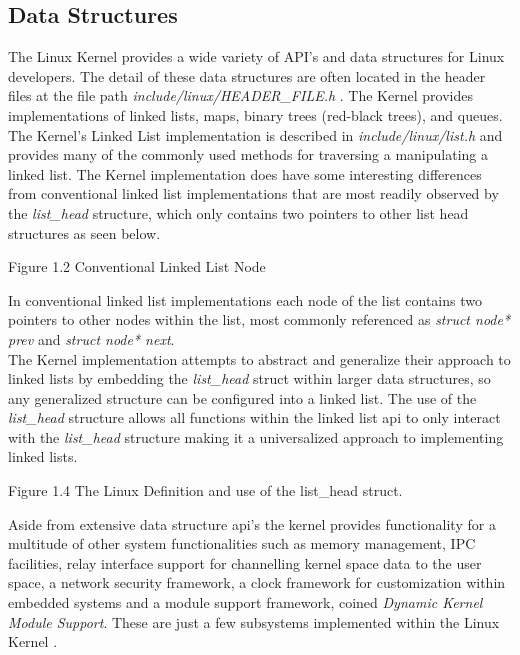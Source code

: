    \subsection{\bf Data Structures}
      \normalfont \indent The Linux Kernel provides a wide variety of API’s and data structures for Linux developers. The detail of these data structures are often located in the header files at the file path \textit{include/linux/HEADER\_FILE.h} \cite{linuxProgInterface2010}. The Kernel provides implementations of linked lists, maps, binary trees (red-black trees), and queues. The Kernel’s Linked List implementation is described in \textit{include/linux/list.h} and provides many of the commonly used methods for traversing a manipulating a linked list. The Kernel implementation does have some interesting differences from conventional linked list implementations that are most readily observed by the \textit{list\_head} structure, which only contains two pointers to other list head structures as seen below.\\ 

        
\begin{center}
Figure 1.2 Conventional Linked List Node 
\end{center}

	\normalfont \indent In conventional linked list implementations each node of the list contains two pointers to other nodes within the list, most commonly referenced as \textit{struct node* prev} and \textit{struct node* next}.\\
	
	\normalfont \indent The Kernel implementation attempts to abstract and generalize their approach to linked lists by embedding the \textit{list\_head} struct within larger data structures, so any generalized structure can be configured into a linked list. The use of the \textit{list\_head} structure allows all functions within the linked list api to only interact with the \textit{list\_head} structure making it a universalized approach to implementing linked lists. \\

        
\begin{center}
Figure 1.4 The Linux Definition and use of the list\_head struct. 
\end{center}


	\normalfont \indent Aside from extensive data structure api’s the kernel provides functionality for a multitude of other system functionalities such as memory management, IPC facilities, relay interface support for channelling kernel space data to the user space, a network security framework, a clock framework for customization within embedded systems and a module support framework, coined \textit{Dynamic Kernel Module Support}. These are just a few subsystems implemented within the Linux Kernel \cite{linuxProgInterface2010}.\\


